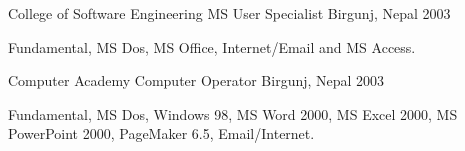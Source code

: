 

\begin{cventries}

  \cventry
    {College of Software Engineering} %
    {MS User Specialist} %
    {Birgunj, Nepal} %
    {2003} %
    {
      \begin{cvitems} %
        \item {Fundamental, MS Dos, MS Office, Internet/Email and MS Access.}        
      \end{cvitems}
    }

  \cventry
    {Computer Academy} %
    {Computer Operator} %
    {Birgunj, Nepal} %
    {2003} %
    {
      \begin{cvitems} %
        \item {Fundamental, MS Dos, Windows 98, MS Word 2000, MS Excel 2000, MS PowerPoint 2000,
PageMaker 6.5, Email/Internet.}        
      \end{cvitems}
    }


\end{cventries}

